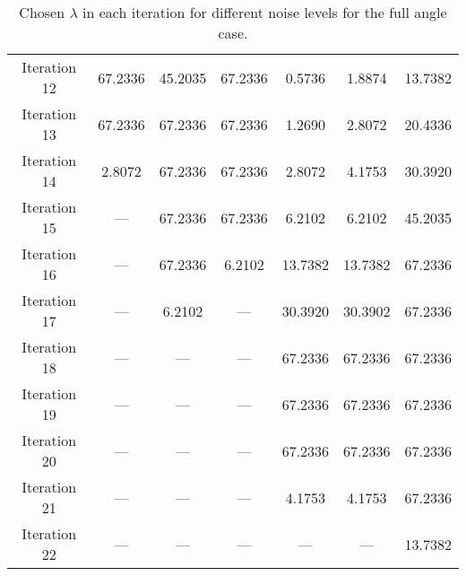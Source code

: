 \begin{table}
\begin{center}
\begin{tabular}{c|ccc|ccc}
      Iteration 12 & 67.2336 & 45.2035 & 67.2336 & 0.5736 & 1.8874 & 13.7382 \\
      Iteration 13 & 67.2336 & 67.2336 & 67.2336 & 1.2690 & 2.8072 & 20.4336 \\
      Iteration 14 & 2.8072 & 67.2336 & 67.2336 & 2.8072 & 4.1753 & 30.3920 \\
      Iteration 15 & --- & 67.2336 & 67.2336 & 6.2102 & 6.2102 & 45.2035 \\
      Iteration 16 & --- & 67.2336 & 6.2102 & 13.7382 & 13.7382 & 67.2336 \\
      Iteration 17 & --- & 6.2102 & --- & 30.3920 & 30.3902 & 67.2336 \\
      Iteration 18 & --- & --- & --- & 67.2336 & 67.2336 & 67.2336 \\
      Iteration 19 & --- & --- & --- & 67.2336 & 67.2336 & 67.2336 \\
      Iteration 20 & --- & --- & --- & 67.2336 & 67.2336 & 67.2336 \\
      Iteration 21 & --- & --- & --- & 4.1753 & 4.1753 & 67.2336 \\
      Iteration 22 & --- & --- & --- & --- & --- & 13.7382 \\
    \end{tabular}
  \end{center}
  \caption{Chosen $\lambda$ in each iteration for different noise
    levels for the full angle case.}
  \label{tab:chosen_lambda_all_lambda_full_angle}
\end{table}





